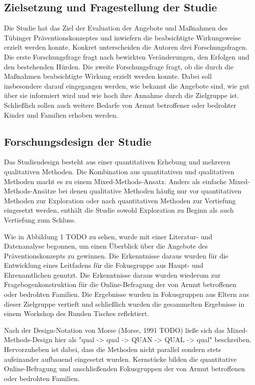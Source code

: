 \subsection{Zielsetzung und Fragestellung der Studie}

Die Studie hat das Ziel der Evaluation der Angebote und Maßnahmen des Tübinger Präventionskonzeptes und inwiefern die beabsichtigte Wirkungsweise erzielt werden konnte. Konkret unterscheiden die Autoren drei Forschungsfragen. Die erste Forschungsfrage fragt nach bewirkten Veränderungen, den Erfolgen und den bestehenden Hürden. Die zweite Forschungsfrage fragt, ob die durch die Maßnahmen beabsichtigte Wirkung erzielt werden konnte. Dabei soll insbesondere darauf eingegangen werden, wie bekannt die Angebote sind, wie gut über sie informiert wird und wie hoch ihre Annahme durch die Zielgruppe ist. Schließlich sollen auch weitere Bedarfe von Armut betroffener oder bedrohter Kinder und Familien erhoben werden.

\subsection{Forschungsdesign der Studie}

Das Studiendesign besteht aus einer quantitativen Erhebung und mehreren qualitativen Methoden. Die Kombination aus quantitativen und qualitativen Methoden macht es zu einem Mixed-Methods-Ansatz. Anders als einfache Mixed-Methods-Ansätze bei denen qualitative Methoden häufig nur vor quantitativen Methoden zur Exploration oder nach quantitativen Methoden zur Vertiefung eingesetzt werden, enthält die Studie sowohl Exploration zu Beginn als auch Vertiefung zum Schluss.

Wie in Abbildung 1 TODO zu sehen, wurde mit einer Literatur- und Datenanalyse begonnen, um einen Überblick über die Angebote des Präventionskonzepts zu gewinnen. Die Erkenntnisse daraus wurden für die Entwicklung eines Leitfadens für die Fokusgruppe aus Haupt- und Ehrenamtlichen genutzt. Die Erkenntnisse daraus wurden wiederum zur Fragebogenkonstruktion für die Online-Befragung der von Armut betroffenen oder bedrohten Familien. Die Ergebnisse wurden in Fokusgruppen aus Eltern aus dieser Zielgruppe vertieft und schließlich wurden die gesammelten Ergebnisse in einem Workshop des Runden Tisches reflektiert.

Nach der Design-Notation von Morse (Morse, 1991 TODO) ließe sich das Mixed-Methods-Design hier als "qual -> qual -> QUAN -> QUAL -> qual" beschreiben. Hervorzuheben ist dabei, dass die Methoden nicht parallel sondern stets aufeinander aufbauend eingesetzt wurden. Kernstücke bilden die quantitative Online-Befragung und anschließenden Fokusgruppen der von Armut betroffenen oder bedrohten Familien.

